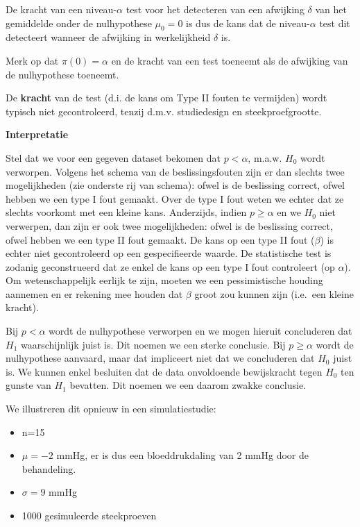 \documentclass[
  12pt,dutch,coursenotes]{book}
\providecommand{\tightlist}{%
  \setlength{\itemsep}{0pt}\setlength{\parskip}{0pt}}
\theoremstyle{definition}
\theoremstyle{definition}
\theoremstyle{definition}
\theoremstyle{remark}
\begin{document}
De kracht van een niveau-\(\alpha\) test voor het detecteren van een afwijking \(\delta\) van het gemiddelde onder de nulhypothese \(\mu_0=0\) is dus de kans dat de niveau-\(\alpha\) test dit detecteert wanneer de afwijking in werkelijkheid \(\delta\) is.

Merk op dat \(\pi(0)=\alpha\) en de kracht van een test toeneemt als de afwijking van de nulhypothese toeneemt.

De \textbf{kracht} van de test (d.i. de kans om Type II fouten te vermijden) wordt typisch niet gecontroleerd, tenzij d.m.v. studiedesign en steekproefgrootte.

\textbf{Interpretatie}

Stel dat we voor een gegeven dataset bekomen dat \(p<\alpha\), m.a.w. \(H_0\) wordt verworpen. Volgens het schema van de beslissingsfouten zijn er dan slechts twee mogelijkheden (zie onderste rij van schema): ofwel is de beslissing correct, ofwel hebben we een type I fout gemaakt. Over de type I fout weten we echter dat ze slechts voorkomt met een kleine kans.
Anderzijds, indien \(p\geq \alpha\) en we \(H_0\) niet verwerpen, dan zijn er ook twee mogelijkheden: ofwel is de beslissing correct, ofwel hebben we een type II fout gemaakt. De kans op een type II fout (\(\beta\)) is echter niet gecontroleerd op een gespecifieerde waarde. De statistische test is zodanig geconstrueerd dat ze enkel de kans op een type I fout controleert (op \(\alpha\)). Om wetenschappelijk eerlijk te zijn, moeten we een pessimistische houding aannemen en er rekening mee houden dat \(\beta\) groot zou kunnen zijn (i.e.~een kleine kracht).

Bij \(p < \alpha\) wordt de nulhypothese verworpen en we mogen hieruit concluderen dat \(H_1\) waarschijnlijk juist is. Dit noemen we een sterke conclusie.
Bij \(p\geq \alpha\) wordt de nulhypothese aanvaard, maar dat impliceert niet dat we concluderen dat \(H_0\) juist is. We kunnen enkel besluiten dat de data onvoldoende bewijskracht tegen \(H_0\) ten gunste van \(H_1\) bevatten. Dit noemen we een daarom zwakke conclusie.

We illustreren dit opnieuw in een simulatiestudie:

\begin{itemize}
\tightlist
\item
  n=15
\item
  \(\mu=-2\) mmHg, er is dus een bloeddrukdaling van 2 mmHg door de behandeling.
\item
  \(\sigma =9\) mmHg
\item
  1000 gesimuleerde steekproeven
\end{itemize}
\end{document}
